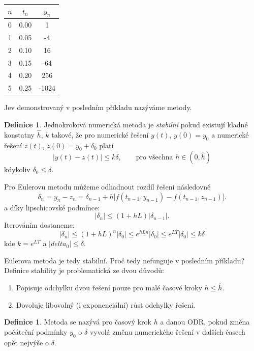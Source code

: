 \documentclass[a4paper, 12pt]{book}
\theoremstyle{definition}
\newtheorem{definition}[theorem]{Definice}
\def\abs#1{\lvert#1\rvert}
\def\df#1{\emph{#1}}
\begin{document}
\begin{table}
\centering
\begin{tabular}{|c|c|c|}
\hline
$n$ & $t_n$ & $y_n$\\ 
\hline
0 & 0.00 & 1\\ 
\hline
1 & 0.05 & -4\\ 
\hline
2 & 0.10 & 16\\ 
\hline
3 & 0.15 & -64\\ 
\hline
4 & 0.20 & 256\\ 
\hline
5 & 0.25 & -1024\\ 
\hline
\hline\end{tabular}
\label{table:instability}
\caption{\small{}} 
\end{table}

Jev demonstrovaný v posledním příkladu nazýváme  metody.
\begin{definition}
 Jednokroková numerická metoda je \df{stabilní} pokud existují kladné konstatny $\hat h$, $k$  takové, že pro numerické řešení $y(t)$, $y(0) = y_0$ 
 a numerické řešení $z(t)$, $z(0) = y_0 + \delta_0$ platí 
 \[
   \abs{y(t) - z(t)} \le k \delta,\qquad \text{pro všechna }h\in(0,\hat h)
 \]
 kdykoliv $\delta_0 \le \delta$.
\end{definition}
Pro Eulerovu metodu můžeme odhadnout rozdíl řešení následovně
\[
  \delta_n = y_n - z_n = \delta_{n-1} + h\big[ f(t_{n-1}, y_{n-1}) - f(t_{n-1}, z_{n-1}) \big].
\]
a díky lipschicovské podmínce:
\[
  \abs{\delta_n} \le (1 + hL)\abs{\delta_{n-1}}.
\]
Iterováním dostaneme:
\[
  \abs{\delta_n} \le (1+hL)^n\abs{\delta_0} \le e^{hLn}\abs{\delta_0} \le e^{LT}\abs{\delta_0} \le k \delta
\]
kde $k = e^{LT}$ a $\abs{delta_0} \le \delta$.

Eulerova metoda je tedy stabilní. Proč tedy nefunguje v posledním příkladu? Definice stability je problematická ze dvou důvodů:
\begin{enumerate}
 \item Popisuje odchylku dvou řešení pouze pro malé časové kroky $h \le \hat h$.
 \item Dovoluje libovolný (i exponenciální) růst odchylky řešení.
\end{enumerate}

\begin{definition}
 Metoda se nazývá  pro časový krok $h$ a danou ODR, pokud změna počáteční podmínky $y_0$ o $\delta$ vyvolá změnu numerického řešení v dalších 
 časech opět nejvýše o $\delta$.
\end{definition}
\end{document}
